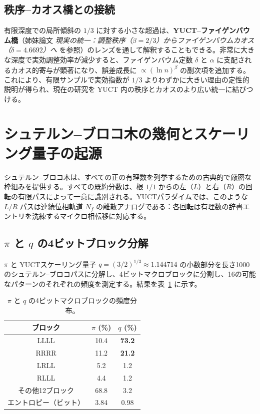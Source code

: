 \documentclass[11pt,a4paper]{article}
\begin{document}
	\subsection{秩序–カオス橋との接続}
	有限深度での局所傾斜の \(1/3\) に対する小さな超過は、\textbf{YUCT–ファイゲンバウム橋}（姉妹論文 \emph{現実の統一：調整秩序（\(\beta=2/3\)）からファイゲンバウムカオス（\(\delta=4.6692\)）へ} を参照）のレンズを通して解釈することもできる。非常に大きな深度で実効調整効率が減少すると、ファイゲンバウム定数 \(\delta\) と \(\alpha\) に支配されるカオス的寄与が顕著になり、誤差成長に \(\propto (\ln n)^{\beta}\) の副次項を追加する。これにより、有限サンプルで実効指数が \(1/3\) よりわずかに大きい理由の定性的説明が得られ、現在の研究を YUCT 内の秩序とカオスのより広い統一に結びつける。
	
	\section{シュテルン–ブロコ木の幾何とスケーリング量子の起源}
	\label{sec:stern-brocot}
	
	シュテルン–ブロコ木は、すべての正の有理数を列挙するための古典的で厳密な枠組みを提供する。すべての既約分数は、根 \(1/1\) からの左（\(L\)）と右（\(R\)）の回転の有限パスによって一意に識別される。YUCTパラダイムでは、このような \(L/R\) パスは連続位相軌道 \(N_f\) の離散アナログである：各回転は有理数の辞書エントリを洗練するマイクロ相転移に対応する。
	
	\subsection{\(\pi\) と \(q\) の4ビットブロック分解}
	
	\(\pi\) と YUCTスケーリング量子 \(q = (3/2)^{1/3} \approx 1.144714\) の小数部分を長さ1000のシュテルン–ブロコパスに分解し、4ビットマクロブロックに分割し、16の可能なパターンのそれぞれの頻度を測定する。結果を表~\ref{tab:block-spectra} に示す。
	
	\begin{table}[htbp]
		\centering
		\caption{\(\pi\) と \(q\) の4ビットマクロブロックの頻度分布。}
		\label{tab:block-spectra}
		\begin{tabular}{c c c}
			\toprule
			ブロック & \(\pi\) (\%) & \(q\) (\%) \\
			\midrule
			LLLL & 10.4 & \textbf{73.2} \\
			RRRR & 11.2 & \textbf{21.2} \\
			LRLL & 5.2 & 1.2 \\
			RLLL & 4.4 & 1.2 \\
			その他12ブロック & 68.8 & 3.2 \\
			\midrule
			エントロピー（ビット） & 3.84 & 0.98 \\
			\bottomrule
		\end{tabular}
	\end{table}
	
\end{document}
